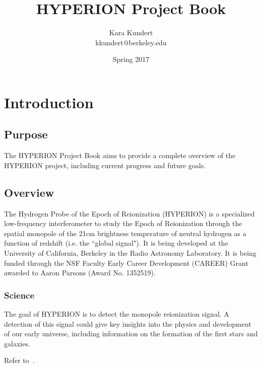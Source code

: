 \documentclass[11pt]{report}
\makeatletter
\newcommand{\thetitle}{HYPERION Project Book}
\newcommand{\theauthor}{Kara Kundert}
\newcommand{\theauthorsemail}{kkundert@berkeley.edu}
\newcommand{\thedate}{Spring 2017}
\makeatother
\begin{document}
\title{
    \sffamily\bfseries\huge
    \thetitle \\
}
\author{
    \sffamily\theauthor \\
    \sffamily\theauthorsemail
}
\date{\thedate}
\maketitle
\sloppy

\tableofcontents{}

\chapter{Introduction}

\section{Purpose}

The HYPERION Project Book aims to provide a complete overview of the HYPERION 
project, including current progress and future goals.

\section{Overview}

The Hydrogen Probe of the Epoch of Reionization (HYPERION) is a specialized 
low-frequency interferometer to study the Epoch of Reionization through the 
spatial monopole of the 21cm brightness temperature of neutral hydrogen as a 
function of redshift (i.e. the ``global signal"). It is being developed at the 
University of California, Berkeley in the Radio Astronomy Laboratory. It is 
being funded through the NSF Faculty Early Career Development (CAREER) Grant 
awarded to Aaron Parsons (Award No. 1352519).

\subsection{Science}

The goal of HYPERION is to detect the monopole reionization signal. A detection 
of this signal could give key insights into the physics and development of our 
early universe, including information on the formation of the first stars and 
galaxies.

Refer to~\citep{pritchard-loeb2010, pritchard-loeb2012, gnedin2004}.  
\end{document}
